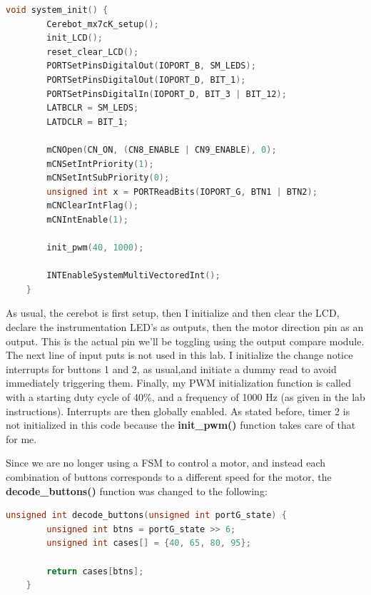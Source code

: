 \documentclass[a4paper, 12pt]{article}
\begin{document}
	\begin{mdframed}[backgroundcolor=code-gray, roundcorner=10pt,
								innerleftmargin=5, innertopmargin=5, innerbottommargin=5]	
	\begin{lstlisting}[language=C, caption=System Initialization, tabsize=2, label={lst:sysinit}]
	void system_init() {
		Cerebot_mx7cK_setup();
		init_LCD();
		reset_clear_LCD();
		PORTSetPinsDigitalOut(IOPORT_B, SM_LEDS);
		PORTSetPinsDigitalOut(IOPORT_D, BIT_1);
		PORTSetPinsDigitalIn(IOPORT_D, BIT_3 | BIT_12);
		LATBCLR = SM_LEDS;
		LATDCLR = BIT_1; 
	
		mCNOpen(CN_ON, (CN8_ENABLE | CN9_ENABLE), 0);
		mCNSetIntPriority(1);
		mCNSetIntSubPriority(0);
		unsigned int x = PORTReadBits(IOPORT_G, BTN1 | BTN2);
		mCNClearIntFlag();
		mCNIntEnable(1);

		init_pwm(40, 1000);

		INTEnableSystemMultiVectoredInt();
	}
	\end{lstlisting}
	\end{mdframed}
	
As usual, the cerebot is first setup, then I initialize and then clear the LCD, declare the instrumentation LED's as outputs, then the motor direction pin as an output. This is the actual pin we'll be toggling using the output compare module. The next line of input puts is not used in this lab. I initialize the change notice interrupts for buttons 1 and 2, as usual,and  initiate a dummy read to avoid immediately triggering them. Finally, my PWM initialization function is called with a starting duty cycle of 40\%, and a frequency of 1000 Hz (as given in the lab instructions). Interrupts are then globally enabled. As stated before, timer 2 is not initialized in this code because the \textbf{init\_pwm()} function takes care of that for me.

Since we are no longer using a FSM to control a motor, and instead each combination of buttons corresponds to a different speed for the motor, the \textbf{decode\_buttons()} function was changed to the following: 

	\begin{mdframed}[backgroundcolor=code-gray, roundcorner=10pt,
								innerleftmargin=5, innertopmargin=5, innerbottommargin=5]	
	\begin{lstlisting}[language=C, caption=Decode Buttons, tabsize=2, label={lst:btndecode}]
	unsigned int decode_buttons(unsigned int portG_state) {
		unsigned int btns = portG_state >> 6;
		unsigned int cases[] = {40, 65, 80, 95};

		return cases[btns];
	}
	\end{lstlisting}
	\end{mdframed}
	
\end{document}
